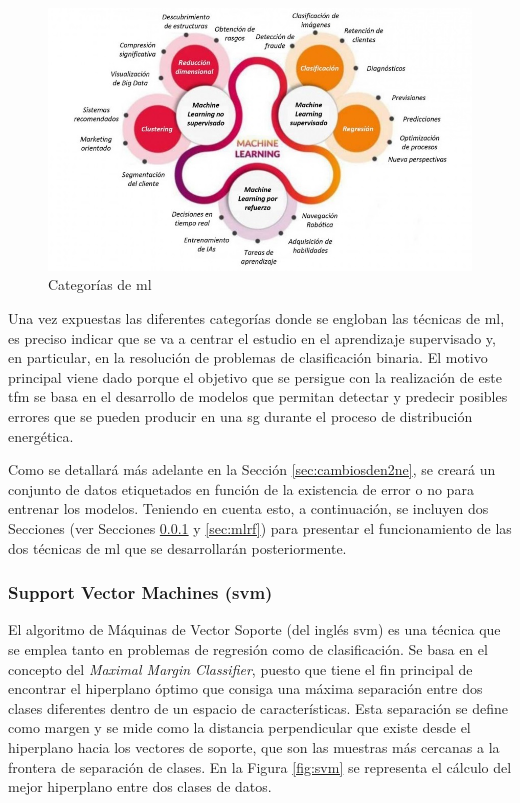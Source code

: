 \begin{figure}[h!]
    \centering
    \includegraphics[width=1\textwidth]{img/teoria/ml.jpeg}
    \caption{Categorías de \acrshort{ml} \cite{metal}}
    \label{fig:ml}
\end{figure}

\vspace{3mm}

Una vez expuestas las diferentes categorías donde se engloban las técnicas de \gls{ml}, es preciso indicar que se va a centrar el estudio en el aprendizaje supervisado y, en particular, en la resolución de problemas de clasificación binaria. El motivo principal viene dado porque el objetivo que se persigue con la realización de este \gls{tfm} se basa en el desarrollo de modelos que permitan detectar y predecir posibles errores que se pueden producir en una \gls{sg} durante el proceso de distribución energética. 

\vspace{3mm}

Como se detallará más adelante en la Sección \ref{sec:cambiosden2ne}, se creará un conjunto de datos etiquetados en función de la existencia de error o no para entrenar los modelos. Teniendo en cuenta esto, a continuación, se incluyen dos Secciones (ver Secciones \ref{sec:mlsvm} y \ref{sec:mlrf}) para presentar el funcionamiento de las dos técnicas de \gls{ml} que se desarrollarán posteriormente.


\subsubsection{Support Vector Machines (\acrshort{svm})}
\label{sec:mlsvm}

El algoritmo de Máquinas de Vector Soporte (del inglés \gls{svm}) es una técnica que se emplea tanto en problemas de regresión como de clasificación. Se basa en el concepto del \textit{Maximal Margin Classifier}, puesto que tiene el fin principal de encontrar el hiperplano óptimo que consiga una máxima separación entre dos clases diferentes dentro de un espacio de características. Esta separación se define como margen y se mide como la distancia perpendicular que existe desde el hiperplano hacia los vectores de soporte, que son las muestras más cercanas a la frontera de separación de clases. En la Figura \ref{fig:svm} se representa el cálculo del mejor hiperplano entre dos clases de datos. \cite{svmciencia}

